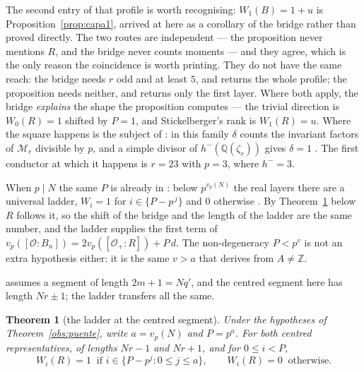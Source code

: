 \documentclass[11pt,a4paper]{article}
\newtheorem{theorem}{Theorem}
\theoremstyle{definition}
\newcommand{\ZZ}{\mathbb{Z}}
\newcommand{\QQ}{\mathbb{Q}}
\newcommand{\cO}{\mathcal{O}}
\begin{document}
The second entry of that profile is worth recognising: $W_1(B)=1+u$ is
Proposition~\ref{prop:capa1}, arrived at here as a corollary of the bridge rather than proved
directly. The two routes are independent --- the proposition never mentions $R$, and the bridge
never counts moments --- and they agree, which is the only reason the coincidence is worth
printing. They do not have the same reach: the bridge needs $r$ odd and at least $5$, and returns
the whole profile; the proposition needs neither, and returns only the first layer. Where both
apply, the bridge \emph{explains} the shape the proposition computes --- the trivial direction is
$W_0(R)=1$ shifted by $P=1$, and Stickelberger's rank is $W_1(R)=u$.
Where the square happens is the subject of \cite[Thm.~12]{Cond}: in this family $\delta$ counts the
invariant factors of $\mathcal M_r$ divisible by $p$, and a simple divisor of $h^-(\QQ(\zeta_r))$
gives $\delta=1$ \cite[Cor.~16]{Cond}. The first conductor at which it happens is $r=23$ with $p=3$, where $h^-=3$.

When $p\mid N$ the same $P$ is already in \cite{Cond}: below $p^{v_p(N)}$ the real layers there
are a universal ladder, $W_i=1$ for $i\in\{P-p^{\,j}\}$ and $0$ otherwise \cite[Prop.~19]{Cond}.
By Theorem~\ref{thm:escalera} below $R$ follows it, so the shift of the bridge and the length of
the ladder are the same number, and
the ladder supplies the first term of $v_p([\cO:B_n])=2v_p([\cO_+:R])+P\,d$. The non-degeneracy
$P<p^v$ is not an extra hypothesis either: it is the same $v>a$ that \cite[Prop.~19]{Cond} derives
from $A\ne\ZZ$.

\cite[Prop.~19]{Cond} assumes a segment of length $2m+1=Nq'$, and the centred segment here has
length $Nr\pm1$; the ladder transfers all the same.

\begin{theorem}[the ladder at the centred segment]\label{thm:escalera}
Under the hypotheses of Theorem~\ref{obs:puente}, write $a=v_p(N)$ and $P=p^a$. For both centred
representatives, of lengths $Nr-1$ and $Nr+1$, and for $0\le i<P$,
\[
W_i(R)=1\ \text{ if } i\in\{P-p^j:0\le j\le a\},\qquad W_i(R)=0\ \text{ otherwise.}
\]
\end{theorem}
\end{document}
